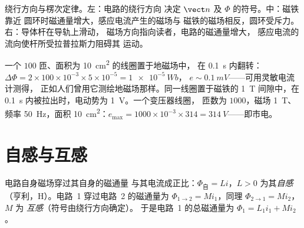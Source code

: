 \begin{omfigure}

{\small 绕行方向与楞次定律。左：电路的绕行方向
决定 $\vect n$ 及 $\Phi$ 的符号。中：磁铁靠近
圆环时磁通量增大，感应电流产生的磁场与
磁铁的磁场相反，圆环受斥力。右：导体杆在导轨上滑动，
磁场方向指向读者，电路的磁通量增大，
感应电流的流向使杆所受拉普拉斯力阻碍其
运动。}
\end{omfigure}

\begin{example}[数量级]\label{ex:b1:induction:orders}
一个 $100$ 匝、面积为 \qty{10}{cm^2} 的线圈置于地磁场中，
在 \qty{0.1}{s} 内翻转：$\Delta\Phi = 2 \times 100 \times 10^{-3} \times 5 \times 10^{-5} = \qty{1e-5}{Wb}$，
$e \sim \qty{0.1}{mV}$——可用灵敏电流计测得，
正如人们曾用它测绘地磁场那样。同一线圈置于磁铁的
\qty{1}{T} 间隙中，在 \qty{0.1}{s} 内被拉出时，电动势为 \qty{1}{V}。一个变压器线圈，
匝数为 $1000$，磁场 \qty{1}{T}、频率 \qty{50}{Hz}，面积 \qty{10}{cm^2}：$e_{\max} =
1000 \times 10^{-3} \times 314 = \qty{314}{V}$——即市电。
\end{example}

\section{自感与互感}

\begin{definition}[电感]\label{def:b1:induction:inductance}
电路自身磁场穿过其自身的磁通量
与其电流成正比：$\Phi_{\text{自}} = Li$，$L > 0$ 为其\emph{自感}
（亨利，\unit{H}）。电路~1 穿过电路~2 的磁通量为
$\Phi_{1 \to 2} = Mi_1$，同理 $\Phi_{2 \to 1} = Mi_2$，$M$ 为
\emph{互感}（符号由绕行方向确定）。
于是电路~1 的总磁通量为 $\Phi_1 = L_1i_1 + Mi_2$。
\end{definition}

